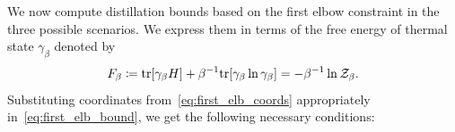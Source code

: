 \documentclass[pra,
aps,
twocolumn,
superscriptaddress,
groupedaddress,
nofootinbib,
reprint
]{revtex4-1}
\begin{document}
We now compute distillation bounds based on the first elbow constraint in the three possible scenarios. 
We express them in terms of the free energy of thermal state $\gamma_\beta$ denoted by
\begin{equation}
	F_\beta \coloneqq {\rm{tr}}[\gamma_\beta H] + \beta^{-1} {\rm{tr}}[\gamma_\beta \ln{\gamma_\beta}] = -\beta^{-1} \ln{\mathcal{Z}_\beta}.
\end{equation}
Substituting coordinates from~\cref{eq:first_elb_coords} appropriately in~\cref{eq:first_elb_bound}, we get the following necessary conditions:
\end{document}
